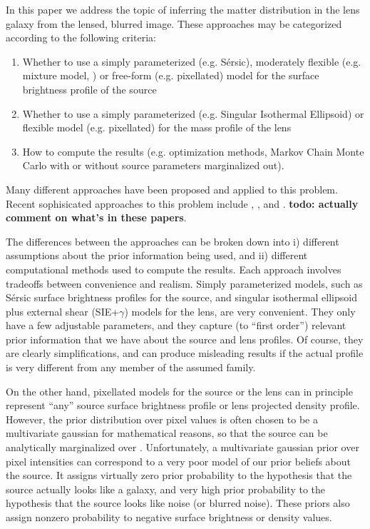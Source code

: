 \documentclass[useAMS,usenatbib]{mn2e}
\begin{document}
In this paper we address the topic of
inferring the matter distribution in the lens galaxy from the lensed,
blurred image. These approaches may be categorized according to the following
criteria:
\begin{enumerate}
\item Whether to use a simply parameterized (e.g. Sérsic), moderately flexible
(e.g. mixture model, \citet{2011MNRAS.412.2521B})
or free-form (e.g. pixellated) model for the surface brightness profile of the source
\item Whether to use a simply parameterized (e.g. Singular Isothermal Ellipsoid)
or flexible model (e.g. pixellated) for the mass profile of the lens
\item How to compute the results (e.g. optimization methods, Markov Chain
Monte Carlo with or without source parameters marginalized out).
\end{enumerate}

Many different approaches have been proposed and applied to
this problem. Recent sophisicated approaches to
this problem include \citet{2014MNRAS.445.2181C},
\citet{2015arXiv150500198T}, and
\citet{2015arXiv150407629B}. {\bf todo: actually comment
on what's in these papers}.



The differences between the approaches can be broken down into
i) different assumptions about the prior information being used, and ii)
different computational methods used to compute the results.
Each approach involves tradeoffs between convenience and realism.
Simply parameterized models, such as Sérsic surface
brightness profiles for the source, and singular isothermal ellipsoid plus
external shear (SIE+$\gamma$) models for the lens, are very
convenient. They only have a few adjustable parameters, and they capture
(to ``first order'') relevant prior information that we have about the
source and lens profiles. Of course, they are clearly simplifications,
and can produce misleading results if the actual profile is very different
from any member of the assumed family.

On the
other hand, pixellated models for the source \citep[e.g.][]{suyu} or the lens
\citep[e.g.][]{2014MNRAS.445.2181C} can in principle represent ``any''
source surface brightness profile or lens projected density profile. However, the prior
distribution over pixel values is often chosen to be a multivariate gaussian
for mathematical reasons, so
that the source can be analytically marginalized over
\citep{2003ApJ...590..673W}. Unfortunately, a multivariate gaussian prior
over pixel intensities can correspond to a very poor model of our prior
beliefs about the source. It assigns virtually zero prior probability
to the hypothesis that the source actually looks like a galaxy, and very high
prior probability to the hypothesis that the source looks like noise (or
blurred noise). These priors also assign nonzero probability to negative
surface brightness or density values.
\end{document}
